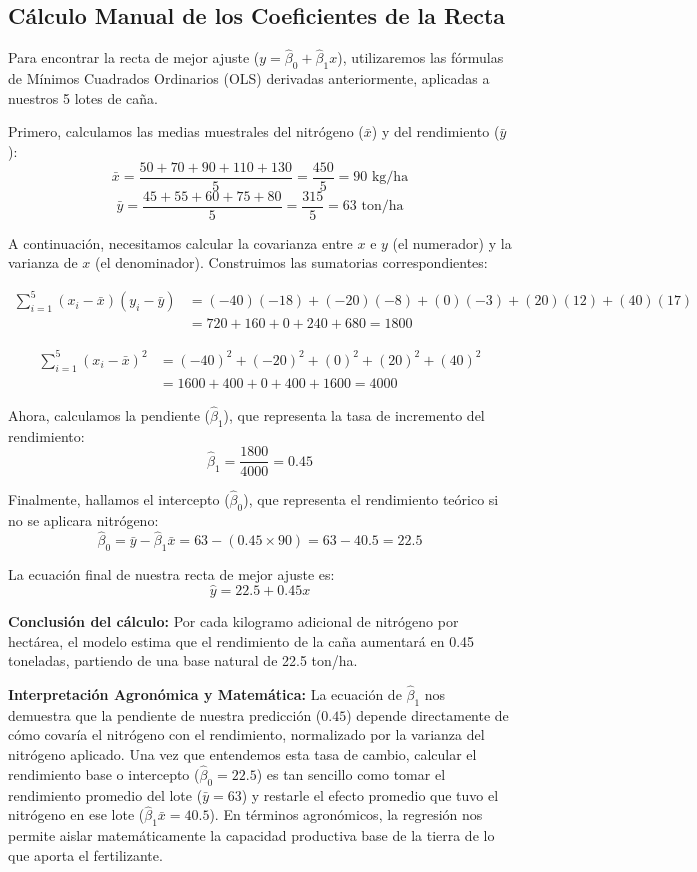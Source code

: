 \documentclass{article}
\begin{document}
\subsection{Cálculo Manual de los Coeficientes de la Recta}

Para encontrar la recta de mejor ajuste ($y = \hat{\beta}_0 + \hat{\beta}_1 x$), utilizaremos las fórmulas de Mínimos Cuadrados Ordinarios (OLS) derivadas anteriormente, aplicadas a nuestros 5 lotes de caña.

Primero, calculamos las medias muestrales del nitrógeno ($\bar{x}$) y del rendimiento ($\bar{y}$):
$$ \bar{x} = \frac{50 + 70 + 90 + 110 + 130}{5} = \frac{450}{5} = 90 \text{ kg/ha} $$
$$ \bar{y} = \frac{45 + 55 + 60 + 75 + 80}{5} = \frac{315}{5} = 63 \text{ ton/ha} $$

A continuación, necesitamos calcular la covarianza entre $x$ e $y$ (el numerador) y la varianza de $x$ (el denominador). Construimos las sumatorias correspondientes:

\begin{align*}
\sum_{i=1}^{5} (x_i - \bar{x})(y_i - \bar{y}) &= (-40)(-18) + (-20)(-8) + (0)(-3) + (20)(12) + (40)(17) \\
&= 720 + 160 + 0 + 240 + 680 = 1800
\end{align*}

\begin{align*}
\sum_{i=1}^{5} (x_i - \bar{x})^2 &= (-40)^2 + (-20)^2 + (0)^2 + (20)^2 + (40)^2 \\
&= 1600 + 400 + 0 + 400 + 1600 = 4000
\end{align*}

Ahora, calculamos la pendiente ($\hat{\beta}_1$), que representa la tasa de incremento del rendimiento:
$$ \hat{\beta}_1 = \frac{1800}{4000} = 0.45 $$

Finalmente, hallamos el intercepto ($\hat{\beta}_0$), que representa el rendimiento teórico si no se aplicara nitrógeno:
$$ \hat{\beta}_0 = \bar{y} - \hat{\beta}_1 \bar{x} = 63 - (0.45 \times 90) = 63 - 40.5 = 22.5 $$

La ecuación final de nuestra recta de mejor ajuste es:
$$ \hat{y} = 22.5 + 0.45x $$

\textbf{Conclusión del cálculo:} Por cada kilogramo adicional de nitrógeno por hectárea, el modelo estima que el rendimiento de la caña aumentará en 0.45 toneladas, partiendo de una base natural de 22.5 ton/ha.


\textbf{Interpretación Agronómica y Matemática:} 
La ecuación de $\hat{\beta}_1$ nos demuestra que la pendiente de nuestra predicción ($0.45$) depende directamente de cómo covaría el nitrógeno con el rendimiento, normalizado por la varianza del nitrógeno aplicado. Una vez que entendemos esta tasa de cambio, calcular el rendimiento base o intercepto ($\hat{\beta}_0 = 22.5$) es tan sencillo como tomar el rendimiento promedio del lote ($\bar{y} = 63$) y restarle el efecto promedio que tuvo el nitrógeno en ese lote ($\hat{\beta}_1 \bar{x} = 40.5$). En términos agronómicos, la regresión nos permite aislar matemáticamente la capacidad productiva base de la tierra de lo que aporta el fertilizante.
\end{document}

